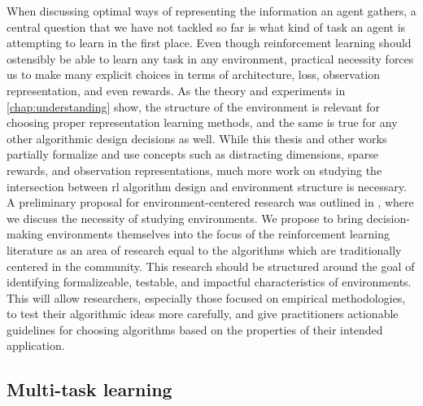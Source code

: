 When discussing optimal ways of representing the information an agent gathers, a central question that we have not tackled so far is what kind of task an agent is attempting to learn in the first place.
Even though reinforcement learning should ostensibly be able to learn any task in any environment, practical necessity forces us to make many explicit choices in terms of architecture, loss, observation representation, and even rewards.
As the theory and experiments in \autoref{chap:understanding} show, the structure of the environment is relevant for choosing proper representation learning methods, and the same is true for any other algorithmic design decisions as well.
While this thesis and other works partially formalize and use concepts such as distracting dimensions, sparse rewards, and observation representations, much more work on studying the intersection between \ac{rl} algorithm design and environment structure is necessary.
A preliminary proposal for environment-centered research was outlined in \textcite{voelcker2024can}, where we discuss the necessity of studying environments.
We propose to bring decision-making environments themselves into the focus of the reinforcement learning literature as an area of research equal to the algorithms which are traditionally centered in the community.
This research should be structured around the goal of identifying formalizeable, testable, and impactful characteristics of environments.
This will allow researchers, especially those focused on empirical methodologies, to test their algorithmic ideas more carefully, and give practitioners actionable guidelines for choosing algorithms based on the properties of their intended application.


\subsection{Multi-task learning}

